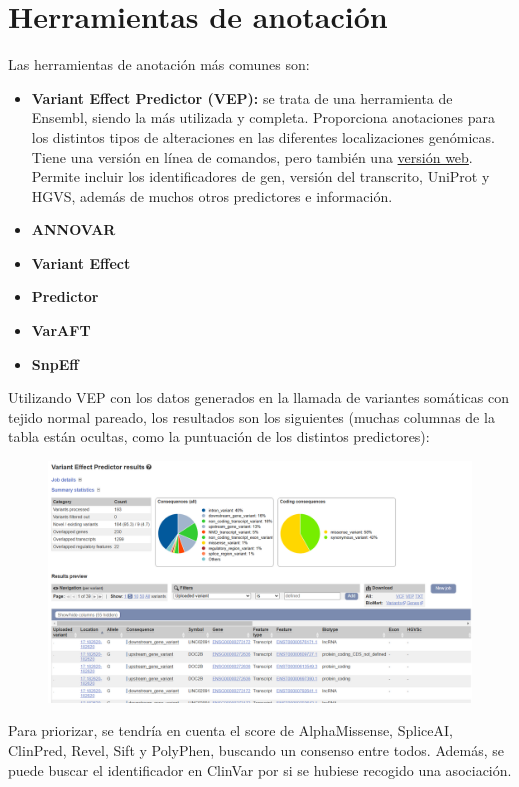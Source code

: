 \section{Herramientas de anotación}
Las herramientas de anotación más comunes son:
\begin{itemize}
\item \textbf{Variant Effect Predictor (VEP):} se trata de una herramienta de Ensembl, siendo la más utilizada y completa. Proporciona anotaciones para los distintos tipos de alteraciones en las diferentes localizaciones genómicas. Tiene una versión en línea de comandos, pero también una \href{https://www.ensembl.org/info/docs/tools/vep/index.html}{versión web}. Permite incluir los identificadores de gen, versión del transcrito, UniProt y HGVS, además de muchos otros predictores e información. 
\item \textbf{ANNOVAR}
\item \textbf{Variant Effect}
\item \textbf{Predictor}
\item \textbf{VarAFT}
\item \textbf{SnpEff}
\end{itemize}

Utilizando VEP con los datos generados en la llamada de variantes somáticas con tejido normal pareado, los resultados son los siguientes (muchas columnas de la tabla están ocultas, como la puntuación de los distintos predictores):
\begin{figure}[htbp]
\centering
\includegraphics[width = \textwidth]{figs/vep-result.png}
\end{figure}

Para priorizar, se tendría en cuenta el score de AlphaMissense, SpliceAI, ClinPred, Revel, Sift y PolyPhen, buscando un consenso entre todos. Además, se puede buscar el identificador en ClinVar por si se hubiese recogido una asociación.